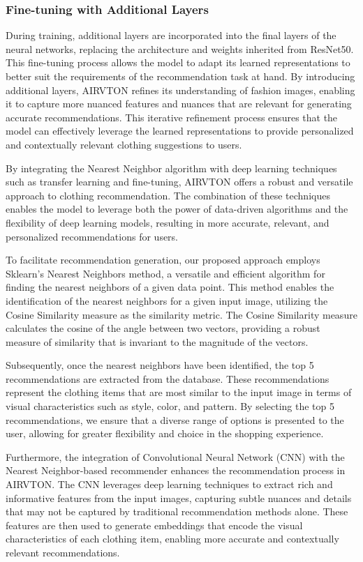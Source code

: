     \subsubsection{Fine-tuning with Additional Layers}

    During training, additional layers are incorporated into the final layers of the neural networks, replacing the architecture and weights inherited from ResNet50. This fine-tuning process allows the model to adapt its learned representations to better suit the requirements of the recommendation task at hand. By introducing additional layers, AIRVTON refines its understanding of fashion images, enabling it to capture more nuanced features and nuances that are relevant for generating accurate recommendations. This iterative refinement process ensures that the model can effectively leverage the learned representations to provide personalized and contextually relevant clothing suggestions to users.

    By integrating the Nearest Neighbor algorithm with deep learning techniques such as transfer learning and fine-tuning, AIRVTON offers a robust and versatile approach to clothing recommendation. The combination of these techniques enables the model to leverage both the power of data-driven algorithms and the flexibility of deep learning models, resulting in more accurate, relevant, and personalized recommendations for users.


	To facilitate recommendation generation, our proposed approach employs Sklearn's Nearest Neighbors method, a versatile and efficient algorithm for finding the nearest neighbors of a given data point. This method enables the identification of the nearest neighbors for a given input image, utilizing the Cosine Similarity measure as the similarity metric. The Cosine Similarity measure calculates the cosine of the angle between two vectors, providing a robust measure of similarity that is invariant to the magnitude of the vectors.

    Subsequently, once the nearest neighbors have been identified, the top 5 recommendations are extracted from the database. These recommendations represent the clothing items that are most similar to the input image in terms of visual characteristics such as style, color, and pattern. By selecting the top 5 recommendations, we ensure that a diverse range of options is presented to the user, allowing for greater flexibility and choice in the shopping experience.

    Furthermore, the integration of Convolutional Neural Network (CNN) with the Nearest Neighbor-based recommender enhances the recommendation process in AIRVTON. The CNN leverages deep learning techniques to extract rich and informative features from the input images, capturing subtle nuances and details that may not be captured by traditional recommendation methods alone. These features are then used to generate embeddings that encode the visual characteristics of each clothing item, enabling more accurate and contextually relevant recommendations.


